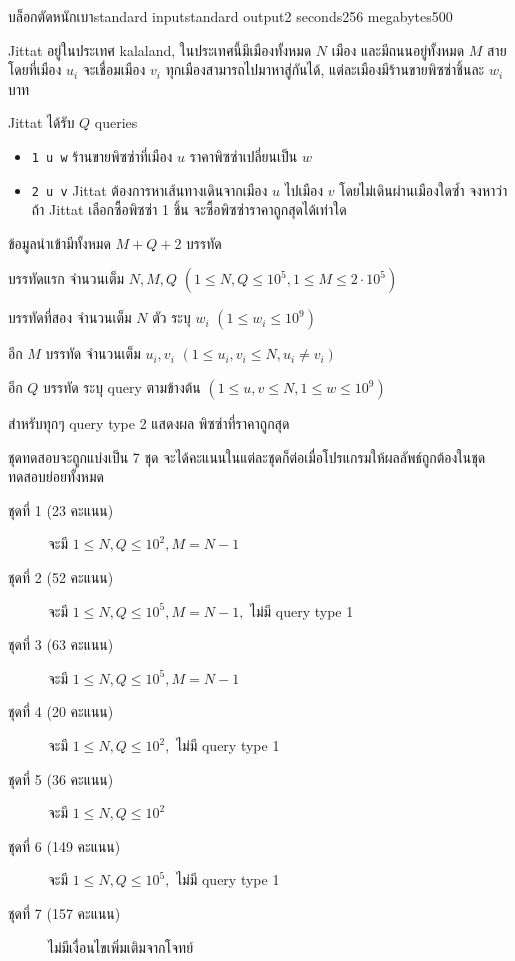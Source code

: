 \documentclass[11pt,a4paper]{article}
\begin{document}
\begin{problem}{บล็อกตัดหนักเบา}{standard input}{standard output}{2 seconds}{256 megabytes}{500}

Jittat อยู่ในประเทศ kalaland, ในประเทศนี้มีเมืองทั้งหมด $N$ เมือง และมีถนนอยู่ทั้งหมด $M$ สาย โดยที่เมือง $u_i$ จะเชื่อมเมือง $v_i$ ทุกเมืองสามารถไปมาหาสู่กันได้, แต่ละเมืองมีร้านขายพิซซ่าชิ้นละ $w_i$ บาท

Jittat ได้รับ $Q$ queries
\begin{itemize}
\item \texttt{1 u w} ร้านขายพิซซ่าที่เมือง $u$ ราคาพิซซ่าเปลี่ยนเป็น $w$

\item \texttt{2 u v} Jittat ต้องการหาเส้นทางเดินจากเมือง $u$ ไปเมือง $v$ โดยไม่เดินผ่านเมืองใดซ้ำ จงหาว่าถ้า Jittat เลือกซื้อพิซซ่า 1 ชิ้น จะซื้อพิซซ่าราคาถูกสุดได้เท่าใด
\end{itemize}

\InputFile
ข้อมูลนำเข้ามีทั้งหมด $M+Q+2$ บรรทัด

บรรทัดแรก จำนวนเต็ม $N,M,Q$ $(1 \le N, Q \le 10^5, 1 \le M \le 2\cdot10^5)$

บรรทัดที่สอง จำนวนเต็ม $N$ ตัว ระบุ $w_i$ $(1 \le w_i \le 10^9)$

อีก $M$ บรรทัด จำนวนเต็ม $u_i, v_i$ $(1 \le u_i, v_i \le N, u_i \neq v_i)$

อีก $Q$ บรรทัด ระบุ query ตามข้างต้น $(1 \le u, v \le N, 1 \le w \le 10^9)$

\OutputFile
สำหรับทุกๆ query type 2 แสดงผล พิซซ่าที่ราคาถูกสุด

\Scoring
ชุดทดสอบจะถูกแบ่งเป็น 7 ชุด จะได้คะแนนในแต่ละชุดก็ต่อเมื่อโปรแกรมให้ผลลัพธ์ถูกต้องในชุดทดสอบย่อยทั้งหมด

\begin{description}
\item[ชุดที่ 1 (23 คะแนน)] จะมี $1 \leq N, Q \leq 10^2, M = N-1$

\item[ชุดที่ 2 (52 คะแนน)] จะมี $1 \leq N, Q \leq 10^5, M = N-1,$ ไม่มี query type 1

\item[ชุดที่ 3 (63 คะแนน)] จะมี $1 \leq N, Q \leq 10^5, M = N-1$

\item[ชุดที่ 4 (20 คะแนน)] จะมี $1 \leq N, Q \leq 10^2,$ ไม่มี query type 1

\item[ชุดที่ 5 (36 คะแนน)] จะมี $1 \leq N, Q \leq 10^2$

\item[ชุดที่ 6 (149 คะแนน)] จะมี $1 \leq N, Q \leq 10^5,$ ไม่มี query type 1

\item[ชุดที่ 7 (157 คะแนน)] ไม่มีเงื่อนไขเพิ่มเติมจากโจทย์
\end{description}

\Examples

\begin{example}
%
%
\end{example}

\end{problem}
\end{document}
